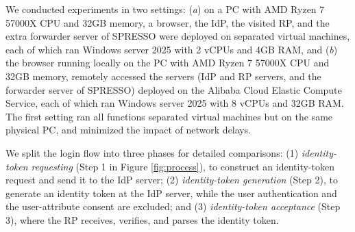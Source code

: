 We conducted experiments in two settings: (\emph{a}) on a PC with AMD Ryzen 7 57000X CPU and 32GB memory, a browser, the IdP, the visited RP, and the extra forwarder server of SPRESSO were deployed on separated virtual machines, each of which ran Windows server 2025 with 2 vCPUs and 4GB RAM, and (\emph{b}) the browser running locally on the PC with AMD Ryzen 7 57000X CPU and 32GB memory, remotely accessed the servers (IdP and RP servers, and the forwarder server of SPRESSO) deployed on the Alibaba Cloud Elastic Compute Service, each of which ran Windows server 2025 with 8 vCPUs and 32GB RAM. 
The first setting ran all functions separated virtual machines but on the same physical PC,
    and minimized the impact of network delays.




 We split the login flow into three phases for detailed comparisons: (1)
{\em identity-token requesting} (Step 1 in Figure \ref{fig:process}), to construct an identity-token request and send it to the IdP server; (2) {\em identity-token generation} (Step 2), to generate an identity token at the IdP server, while the user authentication and the user-attribute consent are excluded; and (3) {\em identity-token acceptance} (Step 3), where the RP receives, verifies, and parses the identity token.




